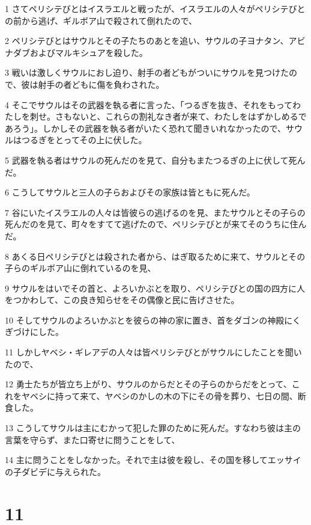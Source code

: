 \par 1 さてペリシテびとはイスラエルと戦ったが、イスラエルの人々がペリシテびとの前から逃げ、ギルボア山で殺されて倒れたので、
\par 2 ペリシテびとはサウルとその子たちのあとを追い、サウルの子ヨナタン、アビナダブおよびマルキシュアを殺した。
\par 3 戦いは激しくサウルにおし迫り、射手の者どもがついにサウルを見つけたので、彼は射手の者どもに傷を負わされた。
\par 4 そこでサウルはその武器を執る者に言った、「つるぎを抜き、それをもってわたしを刺せ。さもないと、これらの割礼なき者が来て、わたしをはずかしめるであろう」。しかしその武器を執る者がいたく恐れて聞きいれなかったので、サウルはつるぎをとってその上に伏した。
\par 5 武器を執る者はサウルの死んだのを見て、自分もまたつるぎの上に伏して死んだ。
\par 6 こうしてサウルと三人の子らおよびその家族は皆ともに死んだ。
\par 7 谷にいたイスラエルの人々は皆彼らの逃げるのを見、またサウルとその子らの死んだのを見て、町々をすてて逃げたので、ペリシテびとが来てそのうちに住んだ。
\par 8 あくる日ペリシテびとは殺された者から、はぎ取るために来て、サウルとその子らのギルボア山に倒れているのを見、
\par 9 サウルをはいでその首と、よろいかぶとを取り、ペリシテびとの国の四方に人をつかわして、この良き知らせをその偶像と民に告げさせた。
\par 10 そしてサウルのよろいかぶとを彼らの神の家に置き、首をダゴンの神殿にくぎづけにした。
\par 11 しかしヤベシ・ギレアデの人々は皆ペリシテびとがサウルにしたことを聞いたので、
\par 12 勇士たちが皆立ち上がり、サウルのからだとその子らのからだをとって、これをヤベシに持って来て、ヤベシのかしの木の下にその骨を葬り、七日の間、断食した。
\par 13 こうしてサウルは主にむかって犯した罪のために死んだ。すなわち彼は主の言葉を守らず、また口寄せに問うことをして、
\par 14 主に問うことをしなかった。それで主は彼を殺し、その国を移してエッサイの子ダビデに与えられた。

\chapter{11}

